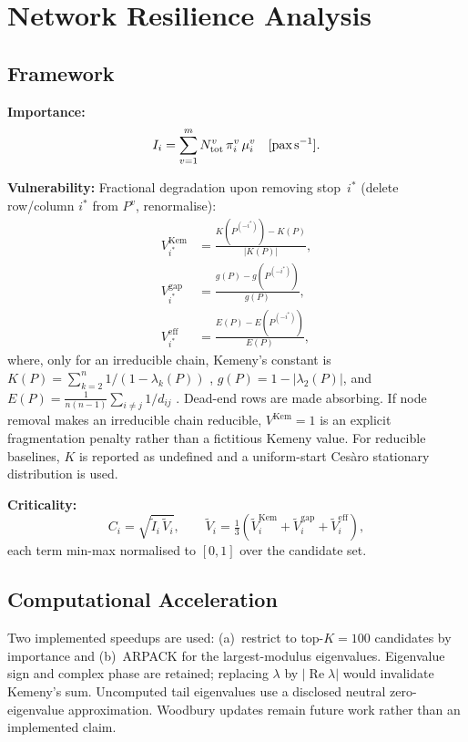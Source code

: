 \documentclass[11pt,a4paper]{article}
\theoremstyle{plain}
\theoremstyle{definition}
\theoremstyle{remark}
\begin{document}
\section{Network Resilience Analysis}
\label{sec:resilience}

\subsection{Framework}

\textbf{Importance:}
\begin{equation}
  I_i = \sum_{v=1}^m N^v_{\mathrm{tot}}\,\pi^v_i\,\mu^v_i
  \quad [\text{pax\,s}^{-1}].
  \label{eq:importance}
\end{equation}

\textbf{Vulnerability:}  Fractional degradation upon removing stop~$i^*$
(delete row/column $i^*$ from $P^v$, renormalise):
\begin{align}
  V^{\mathrm{Kem}}_{i^*} &=
  \frac{K(P^{(-i^*)})-K(P)}{|K(P)|},\\
  V^{\mathrm{gap}}_{i^*} &= \frac{g(P)-g(P^{(-i^*)})}{g(P)},\\
  V^{\mathrm{eff}}_{i^*} &= \frac{E(P)-E(P^{(-i^*)})}{E(P)},
\end{align}
where, only for an irreducible chain, Kemeny's constant is
$K(P)=\sum_{k=2}^n 1/(1-\lambda_k(P))$
\cite{kemeny1976,levene2002}, $g(P)=1-|\lambda_2(P)|$, and
$E(P)=\frac{1}{n(n-1)}\sum_{i\ne j}1/d_{ij}$ \cite{latora2001}.
Dead-end rows are made absorbing.  If node removal makes an irreducible chain
reducible, $V^{\mathrm{Kem}}=1$ is an explicit fragmentation penalty rather
than a fictitious Kemeny value.  For reducible baselines, $K$ is reported as
undefined and a uniform-start Ces\`aro stationary distribution is used.

\textbf{Criticality:}
\begin{equation}
  C_i = \sqrt{\tilde{I}_i\,\tilde{V}_i},\qquad
  \tilde{V}_i = \tfrac{1}{3}
    (\tilde{V}^{\mathrm{Kem}}_i+\tilde{V}^{\mathrm{gap}}_i+\tilde{V}^{\mathrm{eff}}_i),
  \label{eq:criticality}
\end{equation}
each term min-max normalised to $[0,1]$ over the candidate set.

\subsection{Computational Acceleration}

Two implemented speedups are used: (a)~restrict to top-$K=100$ candidates by
importance and (b)~ARPACK for the largest-modulus eigenvalues.  Eigenvalue
sign and complex phase are retained; replacing $\lambda$ by
$|\operatorname{Re}\lambda|$ would invalidate Kemeny's sum.  Uncomputed tail
eigenvalues use a disclosed neutral zero-eigenvalue approximation.  Woodbury
updates remain future work rather than an implemented claim.
\end{document}
